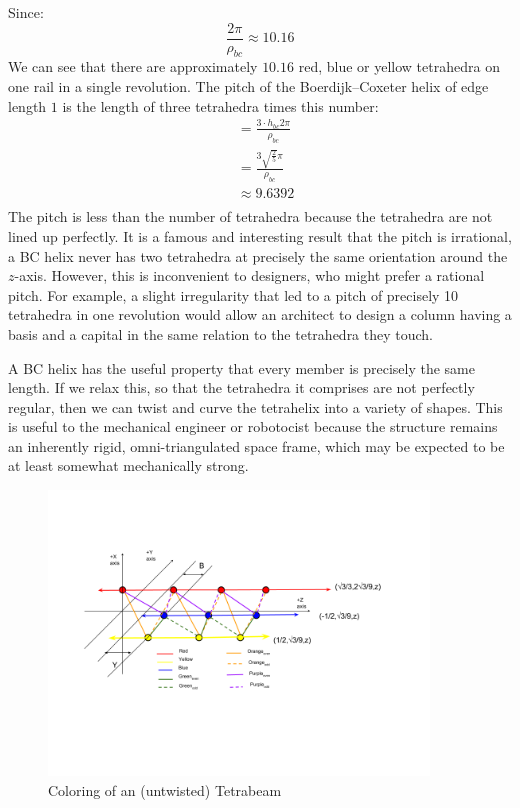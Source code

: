 \documentclass[11pt]{article}
\begin{document}
Since:
\[ \frac{2 \pi}{\rho_{bc}} \approx 10.16
\]
We can see that there are approximately $10.16$ red, blue or yellow tetrahedra on one rail in a single revolution.
The pitch of the Boerdijk--Coxeter helix of edge length $1$ is the length of three tetrahedra times this number:
\begin{align*}
  &= \frac{3 \cdot h_{bc} 2 \pi }{\rho_{bc}} \\
  &= \frac{3  \sqrt{\frac{2}{5}}  \pi}{\rho_{bc}} \\
  &\approx 9.6392 \\
\end{align*}
The pitch is less than the number of tetrahedra because the tetrahedra are not lined up perfectly.
It is a famous and interesting result that the pitch is irrational, a BC helix never has two tetrahedra
at precisely the same orientation around the $z$-axis. However, this is inconvenient to designers, who
might prefer a rational pitch. For example, a slight irregularity that led to a pitch of precisely 10 tetrahedra
in one revolution would allow an architect to design a column having a basis and a capital in the same relation to the tetrahedra
they touch.

A BC helix has the useful property that every member is precisely the same length. If we relax this, so that the tetrahedra it
comprises are not perfectly regular, then we can twist and curve the tetrahelix into a variety of shapes. This is useful to
the mechanical engineer or robotocist because the structure remains an inherently rigid, omni-triangulated space frame, which
may be expected to be at least somewhat mechanically strong.

 \begin{figure}[H]
     \centering
     \includegraphics[width=0.9\textwidth]{figures/TetrahelixColoringDiagram.png}
     \caption{Coloring of an (untwisted) Tetrabeam}
 \end{figure}
\end{document}
